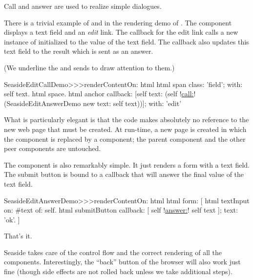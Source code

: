 \documentclass[a4paper,10pt,twoside]{book}
\begin{document}
{{Call and answer are used to realize simple dialogues.

There is a trivial example of  and  in the rendering demo of .
The component  displays a text field and an \emph{edit} link.
The callback for the edit link calls a new instance of  initialized to the value of the text field.
The callback also updates this text field to the result which is sent as an answer.

(We underline the  and  sends to draw attention to them.)

\begin{code}{}
SeasideEditCallDemo>>>renderContentOn: html 
	html span
		class: 'field';
		with: self text.
	html space.
	html anchor
		callback: [self text: (self !\underline{call:}! (SeasideEditAnswerDemo new text: self text))];
		with: 'edit'
\end{code}{}

What is particularly elegant is that the code makes absolutely no reference to the new web page that must be created.
At run-time, a new page is created in which the  component is replaced by a  component; the parent component and the other peer components are untouched.


The  component is also remarkably simple.
It just renders a form with a text field.
The submit button is bound to a callback that will answer the final value of the text field.

\begin{code}{}
SeasideEditAnswerDemo>>>renderContentOn: html
	html form: [
		html textInput
			on: #text of: self.
		html submitButton
			callback: [ self !\underline{answer:}! self text ];
			text: 'ok'.
		]
\end{code}{}

That's it.

Seaside takes care of the control flow and the correct rendering of all the components.
Interestingly, the ``back'' button of the browser will also work just fine (though side effects are not rolled back unless we take additional steps).

}}
\end{document}
